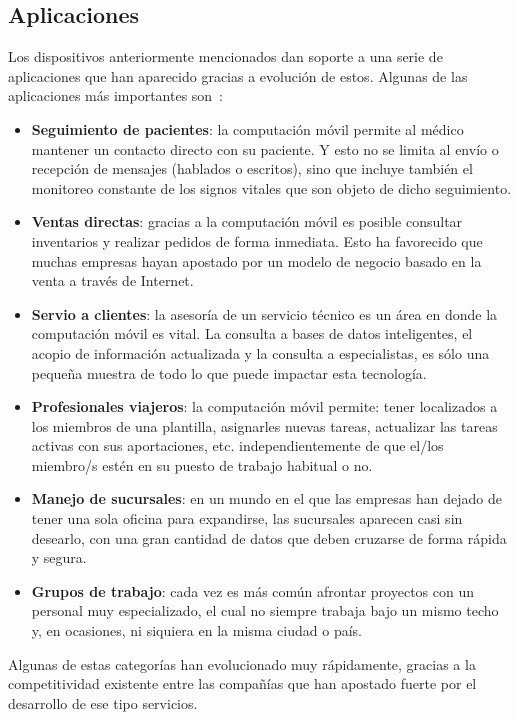   \subsection{Aplicaciones}
Los dispositivos anteriormente mencionados dan soporte a una serie de
aplicaciones que han aparecido gracias a evolución de estos.
Algunas de las aplicaciones más importantes son~\cite{bib:micMobileComputing}:
\begin{itemize}
\item \textbf{Seguimiento de pacientes}: la computación móvil permite al
médico mantener un contacto directo con su paciente. Y esto no se limita
al envío o recepción de mensajes (hablados o escritos), sino que incluye
también el monitoreo constante de los signos vitales que son objeto de dicho
seguimiento.
\item \textbf{Ventas directas}: gracias a la computación móvil es posible
consultar inventarios y realizar pedidos de forma inmediata. Esto ha favorecido
que muchas empresas hayan apostado por un modelo de negocio basado en la
venta a través de Internet.
\item \textbf{Servio a clientes}: la asesoría de un servicio técnico es un
área en donde la computación móvil es vital. La consulta a bases de datos
inteligentes, el acopio de información actualizada y la consulta a
especialistas, es sólo una pequeña muestra de todo lo que puede impactar
esta tecnología.
\item \textbf{Profesionales viajeros}: la computación móvil permite:
tener localizados a los miembros de una plantilla, asignarles nuevas tareas,
actualizar las tareas activas con sus aportaciones, etc. independientemente
de que el/los miembro/s estén en su puesto de trabajo habitual o no.
\item \textbf{Manejo de sucursales}: en un mundo en el que las empresas han
dejado de tener una sola oficina para expandirse, las sucursales aparecen casi
sin desearlo, con una gran cantidad de datos que deben cruzarse de forma rápida 
y segura.
\item \textbf{Grupos de trabajo}: cada vez es más común afrontar proyectos
con un personal muy especializado, el cual no siempre trabaja bajo un mismo
techo y, en ocasiones, ni siquiera en la misma ciudad o país.
\end{itemize}

Algunas de estas categorías han evolucionado muy rápidamente, gracias a la
competitividad existente entre las compañías que han apostado fuerte por el
desarrollo de ese tipo servicios.

